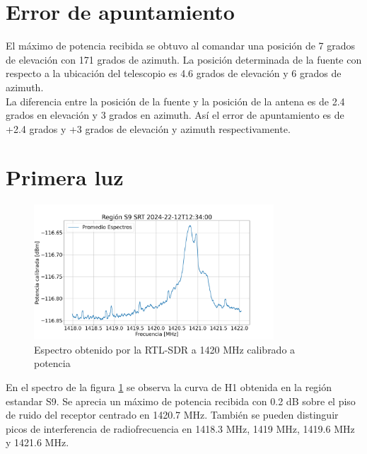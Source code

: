 \section{Error de apuntamiento}

El máximo de potencia recibida se obtuvo al comandar una posición de 7 grados de elevación con 171 grados de azimuth. La posición determinada de la fuente con respecto a la ubicación del telescopio es 4.6 grados de elevación y 6 grados de azimuth.\\

La diferencia entre la posición de la fuente y la posición de la antena es de 2.4 grados en elevación y 3 grados en azimuth. Así el error de apuntamiento es de +2.4 grados y +3 grados de elevación y azimuth respectivamente.\\


\section{Primera luz}

\begin{figure}
    \centering
    \includegraphics[width=0.8\textwidth]{img/h1}
    \caption{Espectro obtenido por la RTL-SDR a 1420 MHz calibrado a potencia}
    \label{fig:firstlight}
\end{figure}

En el spectro de la figura \ref{fig:firstlight} se observa la curva de H1 obtenida en la región estandar S9. Se aprecia un máximo de potencia recibida con 0.2 dB sobre el piso de ruido del receptor centrado en 1420.7 MHz. También se pueden distinguir picos de interferencia de radiofrecuencia en 1418.3 MHz, 1419 MHz, 1419.6 MHz y 1421.6 MHz.\\